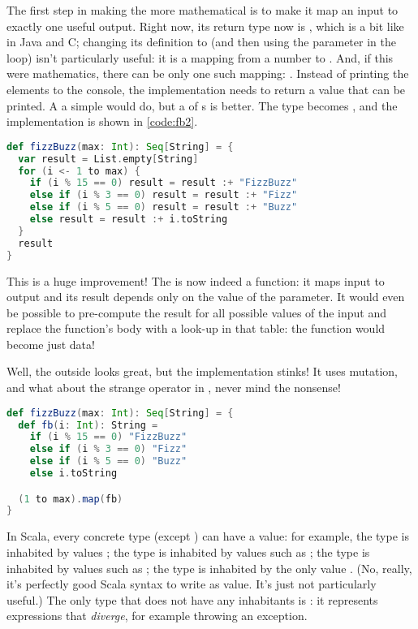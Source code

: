 \documentclass[10 pt]{article}
\begin{document}
The first step in making the  more mathematical is to make it map an input to exactly one useful output. Right now, its return type now is , which is a bit like  in Java and C; changing its definition to  (and then using the  parameter in the loop) isn't particularly useful: it is a mapping from a number to . And, if this were mathematics, there can be only one such mapping: . Instead of printing the elements to the console, the implementation needs to return a value that can be printed. A a simple  would do, but a  of s is better. The type becomes , and the implementation is shown in \autoref{code:fb2}.

\begin{lstlisting}[caption={Fizz Buzz}, label={code:fb2}, language=Scala, escapechar=|]
def fizzBuzz(max: Int): Seq[String] = {
  var result = List.empty[String]
  for (i <- 1 to max) {
    if (i % 15 == 0) result = result :+ "FizzBuzz"
    else if (i % 3 == 0) result = result :+ "Fizz"
    else if (i % 5 == 0) result = result :+ "Buzz"
    else result = result :+ i.toString
  }
  result
}
\end{lstlisting}

This is a huge improvement! The  is now indeed a function: it maps input to output and its result depends only on the value of the parameter. It would even be possible to pre-compute the result for all possible values of the input and replace the function's body with a look-up in that table: the function would become just data! 

Well, the outside looks great, but the implementation stinks! It uses mutation, and what about the strange \pcode{:+} operator in , never mind the  nonsense!

\begin{lstlisting}[caption={Fizz Buzz}, label={code:fb3}, language=Scala, escapechar=|]
def fizzBuzz(max: Int): Seq[String] = {
  def fb(i: Int): String =
    if (i % 15 == 0) "FizzBuzz"
    else if (i % 3 == 0) "Fizz"
    else if (i % 5 == 0) "Buzz"
    else i.toString

  (1 to max).map(fb)
}
\end{lstlisting}




In Scala, every concrete type (except ) can have a value: for example, the type  is inhabited by values ; the type  is inhabited by values such as ; the type  is inhabited by values such as ; the type  is inhabited by the only value \pcode{()}. (No, really, it's perfectly good Scala syntax to write \pcode{()} as value. It's just not particularly useful.) The only type that does not have any inhabitants is : it represents expressions that \emph{diverge}, for example throwing an exception.
\end{document}
